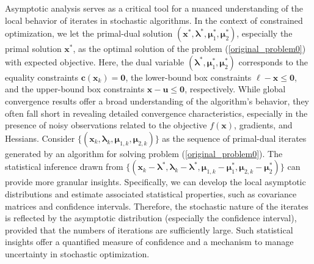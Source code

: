 \documentclass[aos]{imsart}
\numberwithin{equation}{section}
\theoremstyle{plain}
\begin{document}
Asymptotic analysis serves as a critical tool for a nuanced understanding of the local behavior of iterates in stochastic algorithms. In the context of constrained optimization, we let the primal-dual solution $(\bm{x}^{*}, \bm{\lambda}^{*}, \bm{\mu}_1^{*}, \bm{\mu}_2^{*})$, especially the primal solution $\bm{x}^{*}$, as the optimal solution of the problem (\ref{original_problem0}) with expected objective. Here, the dual variable $(\bm{\lambda}^{*}, \bm{\mu}_1^{*}, \bm{\mu}_2^{*})$ corresponds to the equality constraints $\bm{c}(\bm{x}_k) = \bm{0}$, the lower-bound box constraints $\bm{\ell} - \bm{x} \leq \bm{0}$, and the upper-bound box constraints  $\bm{x} - \bm{u} \leq \bm{0}$, respectively. 
While global convergence results offer a broad understanding of the algorithm's behavior, they often fall short in revealing detailed convergence characteristics, especially in the presence of noisy observations related to the objective \(f(\bm{x})\), gradients, and Hessians.
Consider $\{(\bm{x}_k, \bm{\lambda}_{k}, \bm{\mu}_{1,k}, \bm{\mu}_{2,k})\}$ as the sequence of primal-dual iterates generated by an algorithm for solving problem (\ref{original_problem0}). The statistical inference drawn from $\{(\bm{x}_k - \bm{\lambda}^{*}, \bm{\lambda}_{k} - \bm{\lambda}^{*}, \bm{\mu}_{1,k} - \bm{\mu}_1^{*}, \bm{\mu}_{2,k} - \bm{\mu}_2^{*})\}$ 
can provide more granular insights.
Specifically, we can develop the local asymptotic distributions and estimate associated statistical properties, such as covariance matrices and confidence intervals. 
Therefore, the stochastic nature of the iterates is reflected by the asymptotic distribution (especially the confidence interval), provided that the numbers of iterations are sufficiently large. 
Such statistical insights offer a quantified measure of confidence and a mechanism to manage uncertainty in stochastic optimization.
\end{document}
